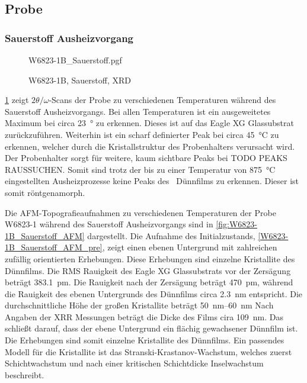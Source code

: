\newcommand{\temperaturesS}{pre,600,700,750,800,875}
\newcommand{\temperaturesV}{pre,500,600,700,750, 800}
\newcommand{\temperaturesVV}{pre,500,600,700}
\newcommand{\temperaturesL}{pre,600, 700, 750, 800}


\newpage

\subsection{Probe \samplethree}\label{subsec:probe-W6823-1}

\subsubsection{Sauerstoff Ausheizvorgang}\label{subsubsec:W6823-1B_Sauerstoff}
\begin{figure}
    \centering
    {W6823-1B_Sauerstoff.pgf}
    \caption{W6823-1B, Sauerstoff, XRD}
    \label{fig:W6823-1B_Sauerstoff_XRD}
\end{figure}
\cref{fig:W6823-1B_Sauerstoff_XRD} zeigt $2\theta/\omega$-Scans der Probe \samplethree zu
verschiedenen Temperaturen während des Sauerstoff Ausheizvorgangs.
Bei allen Temperaturen ist ein ausgeweitetes Maximum bei circa \qty{23}{\degree} zu erkennen.
Dieses ist auf das Eagle XG Glassubstrat zurückzuführen.
Weiterhin ist ein scharf definierter Peak bei circa \qty{45}{\degreeCelsius} zu erkennen, welcher durch die
Kristallstruktur des Probenhalters verursacht wird.
Der Probenhalter sorgt für weitere, kaum sichtbare Peaks bei TODO PEAKS RAUSSUCHEN.
Somit sind trotz der bis zu einer Temperatur von \qty{875}{\degreeCelsius} eingestellten Ausheizprozesse keine Peaks
des \heo\ Dünnfilms zu erkennen.
Dieser ist somit röntgenamorph.

Die AFM-Topografieaufnahmen zu verschiedenen Temperaturen der Probe W6823-1 während des Sauerstoff Ausheizvorgangs sind
in \cref{fig:W6823-1B_Sauerstoff_AFM} dargestellt.
Die Aufnahme des Initialzustands, \cref{W6823-1B_Sauerstoff_AFM_pre}, zeigt einen ebenen Untergrund mit zahlreichen
zufällig orientierten Erhebungen.
Diese Erhebungen sind einzelne Kristallite des Dünnfilms.
Die RMS Rauigkeit des Eagle XG Glassubstrats vor der Zersägung beträgt \qty{383.1}{\pico\meter}.
Die Rauigkeit nach der Zersägung beträgt \qty{470}{\pico\meter}, während die Rauigkeit des ebenen Untergrunds des
Dünnfilms circa \qty{2.3}{\nano\meter} entspricht.
Die durchschnittliche Höhe der großen Kristallite beträgt \qtyrange{50}{60}{\nano\meter}
Nach Angaben der XRR Messungen beträgt die Dicke des Films cira \qty{109}{\nano\meter}.
Das schließt darauf, dass der ebene Untergrund ein flächig gewachsener Dünnfilm ist.
Die Erhebungen sind somit einzelne Kristallite des Dünnfilms.
Ein passendes Modell für die Kristallite ist das Stranski-Krastanov-Wachstum, welches
zuerst Schichtwachstum und nach einer kritischen Schichtdicke Inselwachstum beschreibt.

